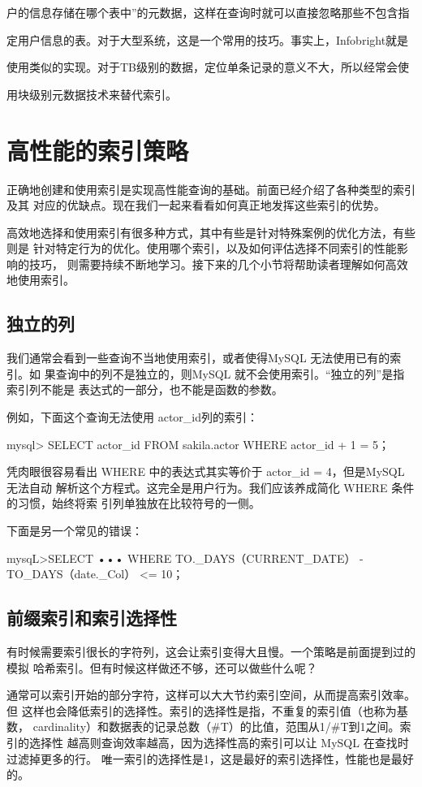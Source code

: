 户的信息存储在哪个表中”的元数据，这样在查询时就可以直接忽略那些不包含指

定用户信息的表。对于大型系统，这是一个常用的技巧。事实上，Infobright就是

使用类似的实现。对于TB级别的数据，定位单条记录的意义不大，所以经常会使

用块级别元数据技术来替代索引。

\section{高性能的索引策略}
正确地创建和使用索引是实现高性能查询的基础。前面已经介绍了各种类型的索引及其
对应的优缺点。现在我们一起来看看如何真正地发挥这些索引的优势。

高效地选择和使用索引有很多种方式，其中有些是针对特殊案例的优化方法，有些则是
针对特定行为的优化。使用哪个索引，以及如何评估选择不同索引的性能影响的技巧，
则需要持续不断地学习。接下来的几个小节将帮助读者理解如何高效地使用索引。

\subsection{独立的列}
我们通常会看到一些查询不当地使用索引，或者使得MySQL 无法使用已有的索引。如
果查询中的列不是独立的，则MySQL 就不会使用索引。“独立的列”是指索引列不能是
表达式的一部分，也不能是函数的参数。

例如，下面这个查询无法使用 actor\_id列的索引：

mysql> SELECT actor\_id FROM sakila.actor WHERE actor\_id + 1 = 5；

凭肉眼很容易看出 WHERE 中的表达式其实等价于 actor\_id = 4，但是MySQL 无法自动
解析这个方程式。这完全是用户行为。我们应该养成简化 WHERE 条件的习惯，始终将索
引列单独放在比较符号的一侧。

下面是另一个常见的错误：

mysqL>SELECT ••• WHERE TO.\_DAYS（CURRENT\_DATE） - TO\_DAYS（date.\_Col） <= 10；

\subsection{前缀索引和索引选择性}
有时候需要索引很长的字符列，这会让索引变得大且慢。一个策略是前面提到过的模拟
哈希索引。但有时候这样做还不够，还可以做些什么呢？

通常可以索引开始的部分字符，这样可以大大节约索引空间，从而提高索引效率。但
这样也会降低索引的选择性。索引的选择性是指，不重复的索引值（也称为基数，
cardinality）和数据表的记录总数（#T）的比值，范围从1/#T到1之间。索引的选择性
越高则查询效率越高，因为选择性高的索引可以让 MySQL 在查找时过滤掉更多的行。
唯一索引的选择性是1，这是最好的索引选择性，性能也是最好的。


